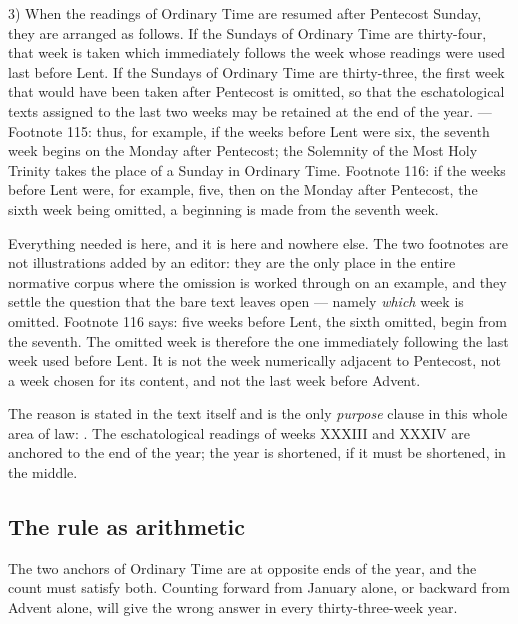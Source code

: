 \begin{workingrendering}
3) When the readings of Ordinary Time are resumed after Pentecost Sunday, they are arranged as
follows. If the Sundays of Ordinary Time are thirty-four, that week is taken which immediately
follows the week whose readings were used last before Lent. If the Sundays of Ordinary Time are
thirty-three, the first week that would have been taken after Pentecost is omitted, so that the
eschatological texts assigned to the last two weeks may be retained at the end of the year. ---
Footnote 115: thus, for example, if the weeks before Lent were six, the seventh week begins on the
Monday after Pentecost; the Solemnity of the Most Holy Trinity takes the place of a Sunday in
Ordinary Time. Footnote 116: if the weeks before Lent were, for example, five, then on the Monday
after Pentecost, the sixth week being omitted, a beginning is made from the seventh week.
\end{workingrendering}

Everything needed is here, and it is here and nowhere else. The two footnotes are not illustrations
added by an editor: they are the only place in the entire normative corpus where the omission is
worked through on an example, and they settle the question that the bare text leaves open --- namely
\emph{which} week is omitted. Footnote 116 says: five weeks before Lent, the sixth omitted, begin
from the seventh. The omitted week is therefore the one immediately following the last week used
before Lent. It is not the week numerically adjacent to Pentecost, not a week chosen for its
content, and not the last week before Advent.

The reason is stated in the text itself and is the only \emph{purpose} clause in this whole area of
law: . The eschatological readings of weeks XXXIII and XXXIV are anchored to the end of the
year; the year is shortened, if it must be shortened, in the middle.

\subsection{The rule as arithmetic}

The two anchors of Ordinary Time are at opposite ends of the year, and the count must satisfy both.
Counting forward from January alone, or backward from Advent alone, will give the wrong answer in
every thirty-three-week year.

